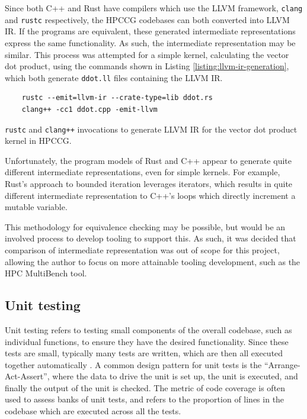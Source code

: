 Since both C++ and Rust have compilers which use the LLVM framework, \texttt{clang} and \texttt{rustc} respectively, the HPCCG codebases can both converted into \acrshort{LLVM IR}. If the programs are equivalent, these generated intermediate representations express the same functionality. As such, the intermediate representation may be similar. This process was attempted for a simple kernel, calculating the vector dot product, using the commands shown in Listing \ref{listing:llvm-ir-generation}, which both generate \texttt{ddot.ll} files containing the \acrshort{LLVM IR}.

\begin{code}
    \begin{verbatim}
    rustc --emit=llvm-ir --crate-type=lib ddot.rs
    clang++ -cc1 ddot.cpp -emit-llvm
    \end{verbatim}
    \caption{\texttt{rustc} and \texttt{clang++} invocations to generate \acrshort{LLVM IR} for the vector dot product kernel in HPCCG.}
    \label{listing:llvm-ir-generation}
\end{code}

Unfortunately, the program models of Rust and C++ appear to generate quite different intermediate representations, even for simple kernels. For example, Rust's approach to bounded iteration leverages iterators, which results in quite different intermediate representation to C++'s loops which directly increment a mutable variable.

This methodology for equivalence checking may be possible, but would be an involved process to develop tooling to support this. As such, it was decided that comparison of intermediate representation was out of scope for this project, allowing the author to focus on more attainable tooling development, such as the HPC MultiBench tool.

\subsection{Unit testing}
\label{ssec:equivalence-unit-testing}

Unit testing refers to testing small components of the overall codebase, such as individual functions, to ensure they have the desired functionality. Since these tests are small, typically many tests are written, which are then all executed together automatically \cite{archiveddocsTestEarlyOften2012}. A common design pattern for unit tests is the ``Arrange-Act-Assert'', where the data to drive the unit is set up, the unit is executed, and finally the output of the unit is checked. The metric of code coverage is often used to assess banks of unit tests, and refers to the proportion of lines in the codebase which are executed across all the tests.

